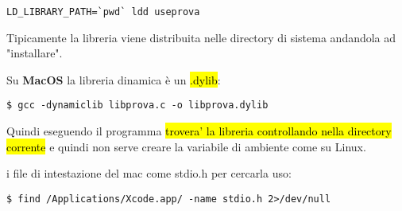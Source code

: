 \begin{lstlisting}
LD_LIBRARY_PATH=`pwd` ldd useprova
\end{lstlisting}

Tipicamente la libreria viene distribuita nelle directory di sistema andandola ad "installare".


Su \textbf{MacOS} la libreria dinamica è un \hl{.dylib}:

\begin{lstlisting}
$ gcc -dynamiclib libprova.c -o libprova.dylib
\end{lstlisting}

Quindi eseguendo il programma \hl{trovera' la libreria controllando nella directory corrente} e quindi non serve creare la variabile di ambiente come su Linux.

i file di intestazione del mac come stdio.h per cercarla uso:

\begin{lstlisting}
$ find /Applications/Xcode.app/ -name stdio.h 2>/dev/null
\end{lstlisting}


